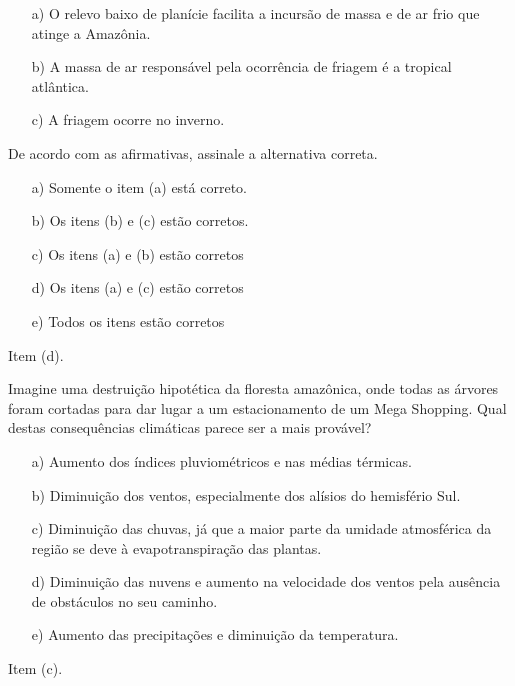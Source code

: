 \documentclass[letterpaper,portuguese,12pt,pdftex]{exam}
\begin{document}
\begin{questions}
\begin{itemize}
  \item[a)] O relevo baixo de planície facilita a incursão de massa e de ar
            frio que atinge a Amazônia.
  \item[b)] A massa de ar responsável pela ocorrência de friagem é a tropical
            atlântica.
  \item[c)] A friagem ocorre no inverno.
\end{itemize}

De acordo com as afirmativas, assinale a alternativa correta.

\begin{itemize}
  \item[a)] Somente o item (a) está correto.
  \item[b)] Os itens (b) e (c) estão corretos.
  \item[c)] Os itens (a) e (b) estão corretos
  \item[d)] Os itens (a) e (c) estão corretos
  \item[e)] Todos os itens estão corretos
\end{itemize}

\begin{solution}
  Item (d).
\end{solution}


\question[2]
Imagine uma destruição hipotética da floresta amazônica, onde todas as
árvores foram cortadas para dar lugar a um estacionamento de um Mega Shopping.
Qual destas consequências climáticas parece ser a mais provável?

\begin{itemize}
  \item[a)] Aumento dos índices pluviométricos e nas médias térmicas.
  \item[b)] Diminuição dos ventos, especialmente dos alísios do hemisfério Sul.
  \item[c)] Diminuição das chuvas, já que a maior parte da umidade atmosférica
            da região se deve à evapotranspiração das plantas.
  \item[d)] Diminuição das nuvens e aumento na velocidade dos ventos pela
            ausência de obstáculos no seu caminho.
  \item[e)] Aumento das precipitações e diminuição da temperatura.
\end{itemize}

\begin{solution}
  Item (c).
\end{solution}


\end{questions}
\end{document}
